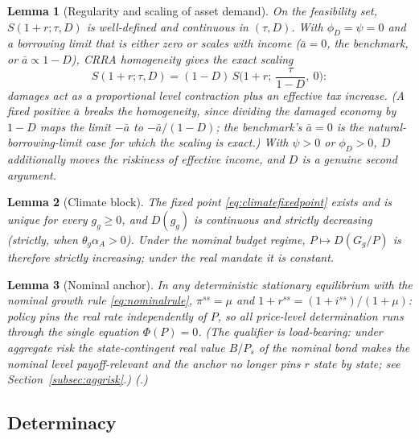 \documentclass[12pt]{article}
\newtheorem{lemma}{Lemma}
\newcommand{\Sfun}{S}
\begin{document}
\begin{lemma}[Regularity and scaling of asset demand]\label{lem:S}
On the feasibility set, $\Sfun(1+r;\tau,D)$ is well-defined and continuous in
$(\tau,D)$. With $\phi_D=\psi=0$ and a borrowing limit that is either
zero or scales with income ($\bar a = 0$, the benchmark, or
$\bar a \propto 1-D$), CRRA homogeneity gives the exact scaling
\begin{equation}
\Sfun(1+r;\tau,D) = (1-D)\,\Sfun\!\Big(1+r;\ \frac{\tau}{1-D},\ 0\Big):
\label{eq:scaling}
\end{equation}
damages act as a proportional level contraction plus an effective tax
increase. (A fixed positive $\bar a$ breaks the homogeneity, since dividing
the damaged economy by $1-D$ maps the limit $-\bar a$ to $-\bar a/(1-D)$;
the benchmark's $\bar a=0$ is the natural-borrowing-limit case for which the
scaling is exact.) With $\psi>0$ or $\phi_D>0$, $D$ additionally moves the
riskiness of effective income, and $D$ is a genuine second argument.
\end{lemma}

\begin{lemma}[Climate block]\label{lem:climate}
The fixed point \eqref{eq:climatefixedpoint} exists and is unique for every
$g_g\ge0$, and $D(g_g)$ is continuous and strictly decreasing (strictly, when
$\theta_g\alpha_A>0$). Under the nominal budget regime, $P\mapsto D(G_g/P)$
is therefore strictly increasing; under the real mandate it is constant.
\end{lemma}

\begin{lemma}[Nominal anchor]\label{lem:anchor}
In any \emph{deterministic} stationary equilibrium with the nominal growth
rule \eqref{eq:nominalrule}, $\pi^{ss}=\mu$ and
$1+r^{ss}=(1+i^{ss})/(1+\mu)$: policy pins the real rate independently of
$P$, so all price-level determination runs through the single equation
$\Phi(P)=0$. (The qualifier is load-bearing: under aggregate risk the
state-contingent real value $B/P_s$ of the nominal bond makes the nominal
level payoff-relevant and the anchor no longer pins $r$ state by state;
see Section~\ref{subsec:aggrisk}.) (\citealp{hagedorn2026dtpl}.)
\end{lemma}

\subsection{Determinacy}
\end{document}
